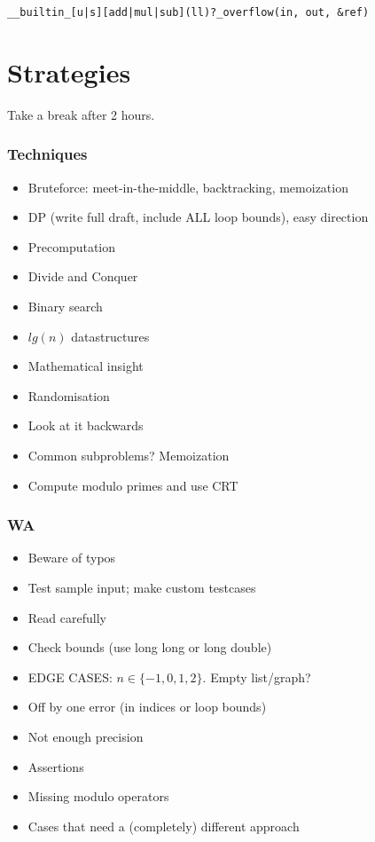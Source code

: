 \documentclass[
	a4paper,
	landscape,
	10pt,
	article
]{article}
\begin{document}
\texttt{\_\_builtin\_[u|s][add|mul|sub](ll)?\_overflow(in, out, \&ref)} 

\newpage
\section{Strategies}
Take a break after 2 hours.
\subsubsection*{Techniques}
\begin{itemize}
\setlength\itemsep{0em}
	\item Bruteforce: meet-in-the-middle, backtracking, memoization
	\item DP (write full draft, include ALL loop bounds), easy direction
	\item Precomputation
	\item Divide and Conquer
	\item Binary search
	\item $lg(n)$ datastructures
	\item Mathematical insight
	\item Randomisation
	\item Look at it backwards
	\item Common subproblems? Memoization
	\item Compute modulo primes and use CRT
\end{itemize}

\subsubsection*{WA}
\begin{itemize}
	\setlength\itemsep{0em}
	\item Beware of typos
	\item Test sample input; make custom testcases
	\item Read carefully
	\item Check bounds (use long long or long double)
	\item EDGE CASES: $n\in\{-1,0,1,2\}$. Empty list/graph?
	\item Off by one error (in indices or loop bounds)
	\item Not enough precision
	\item Assertions
	\item Missing modulo operators
	\item Cases that need a (completely) different approach
\end{itemize}
\end{document}
